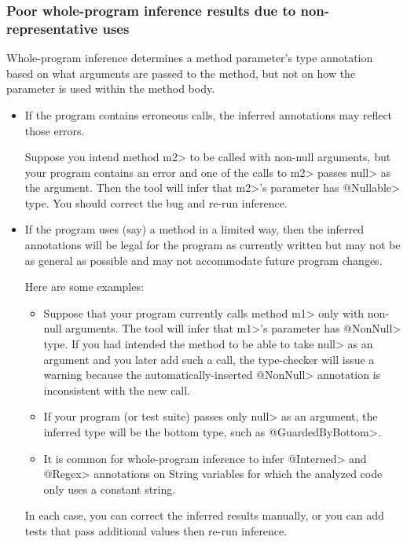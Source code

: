 \subsubsection{Poor whole-program inference results due to non-representative uses\label{whole-program-inference-non-representative-uses}}

Whole-program inference determines a method parameter's type
annotation based on what arguments are passed to the method, but not on how the
parameter is used within the method body.

\begin{itemize}
\item
If the program contains erroneous calls, the
inferred annotations may reflect those errors.

Suppose you intend method \<m2> to be called with
non-null arguments, but your program contains an error and one of the calls
to \<m2> passes \<null> as the argument.  Then the tool will infer that
\<m2>'s parameter has \<@Nullable> type.
You should correct the bug and re-run inference.

\item
If the program uses (say) a method in a limited way, then the inferred
annotations will be legal for the program as
currently written but may not be as general as possible and may not
accommodate future program changes.

Here are some examples:

\begin{itemize}
\item
Suppose that your program currently calls
method \<m1> only with non-null
arguments.  The tool will infer that \<m1>'s parameter has
\<@NonNull> type.  If you had intended the method to be able to
take \<null> as an argument and you later add such a call, the type-checker
will issue a warning because the automatically-inserted \<@NonNull>
annotation is inconsistent with the new call.

\item
If your program (or test suite) passes only \<null> as an argument, the
inferred type will be the bottom type, such as \<@GuardedByBottom>.

\item
It is common for whole-program inference to infer
\<@Interned> and \<@Regex> annotations on String variables for which the
analyzed code only uses a constant string.

\end{itemize}

In each case, you can correct the inferred results manually, or you can
add tests that pass additional values then re-run inference.

\end{itemize}


